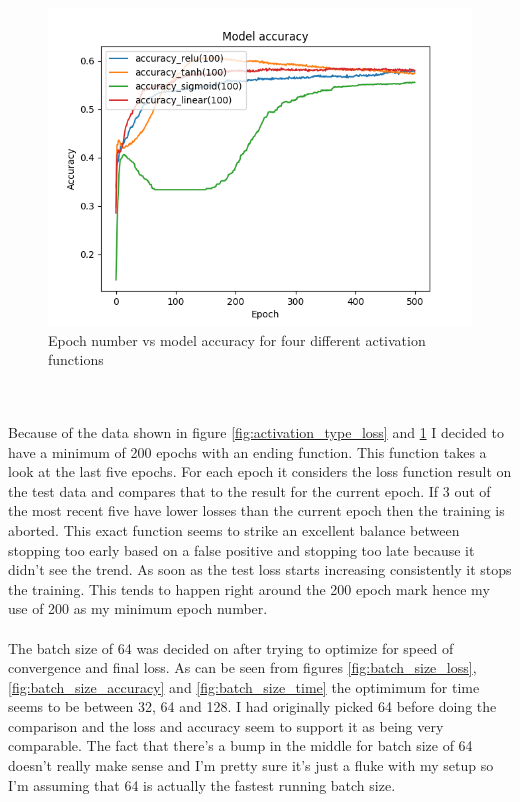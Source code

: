 \documentclass[conference]{IEEEtran}
\begin{document}
\begin{figure}
  \includegraphics[width=\linewidth]{figs/different_activation_types_accuracy.png}
  \caption{Epoch number vs model accuracy for four different activation functions}
  \label{fig:activation_type_accuracy}
\end{figure}
\\\\
Because of the data shown in figure \ref{fig:activation_type_loss} and \ref{fig:activation_type_accuracy} I decided to have a minimum of 200 epochs with an ending function. This function takes a look at the last five epochs. For each epoch it considers the loss function result on the test data and compares that to the result for the current epoch. If 3 out of the most recent five have lower losses than the current epoch then the training is aborted. This exact function seems to strike an excellent balance between stopping too early based on a false positive and stopping too late because it didn't see the trend. As soon as the test loss starts increasing consistently it stops the training. This tends to happen right around the 200 epoch mark hence my use of 200 as my minimum epoch number.
\\\\
The batch size of 64 was decided on after trying to optimize for speed of convergence and final loss. As can be seen from figures \ref{fig:batch_size_loss}, \ref{fig:batch_size_accuracy} and \ref{fig:batch_size_time} the optimimum for time seems to be between 32, 64 and 128. I had originally picked 64 before doing the comparison and the loss and accuracy seem to support it as being very comparable. The fact that there's a bump in the middle for batch size of 64 doesn't really make sense and I'm pretty sure it's just a fluke with my setup so I'm assuming that 64 is actually the fastest running batch size.
\end{document}
